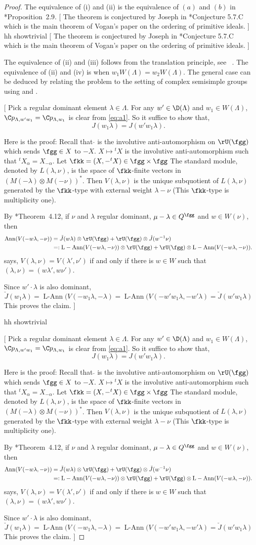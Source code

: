 \documentclass[12pt]{amsart}
\newcommand{\trivial}[2][]{\if\relax\detokenize{#1}\relax
  {%
      \color{orange} \vspace{0em}$[$#2$]$
      \color{black}
  }
  \else
\ifx#1h
\ifcsname showtrivial\endcsname
{%
    \color{orange}\vspace{0em}$[$#2$]$
    \color{black}
}
\fi
\else {\red Wrong argument!} \fi
\fi
}
\DeclareMathOperator{\Ann}{Ann}
\DeclareMathOperator{\LAnn}{L-Ann}
\numberwithin{equation}{section}
\theoremstyle{remark}
\begin{document}
\begin{proof}
The equivalence of (i) and (ii) is the equivalence of $(a)$ and $(b)$
in \cite{BV2}*{Proposition~2.9}.\trivial[h]{ The theorem is conjectured by Joseph in \cite{J79W}*{Conjecture 5.7.C}
which is the main theorem of Vogan's paper on the ordering of primitive ideals. }
The equivalence of (ii) and (iii) follows from the translation principle,
see~ \cite[Lemma~2.7]{V1}.
The equivalence of (ii) and (iv) is \cite[Theorem~5.1 and 5.5]{J2} when
$w_1 W(\Lambda) = w_2 W(\Lambda)$. The general case can be deduced by relating the problem to the setting of complex semisimple groups using  \cite[Theorem~4.12]{J79D} and \cite[Proposition~3.7]{Du77}.
\trivial[h]{
Pick a regular dominant element $\lambda\in \Lambda$.
For any $w'\in \D(\Lambda)$ and $w_1\in W(\Lambda)$,
$\C p_{\Lambda, w'w_1} = \C p_{\Lambda,w_1}$ is clear from \eqref{eq:a1}.
So it suffice to show that,
\[
J(w_1\lambda) = J(w'w_1\lambda).
\]

Here is the proof:
Recall that $\check{}$ is the involutive anti-automorphism on $\rU(\fgg)$ which sends $\fgg\in X$ to $-X$.
$X\mapsto {}^tX$ is the involutive anti-automorphism such that ${}^tX_\alpha = X_{-\alpha}$.
Let $\fkk = (X,-{}^tX) \in \fgg\times \fgg$
The standard module, denoted by $L(\lambda,\nu)$, is the space of $\fkk$-finite vectors in $(M(-\lambda)\otimes M(-\nu))^*$.
Then $V(\lambda,\nu)$ is the unique subquotient of $L(\lambda,\nu)$ generated by
the $\fkk$-type with external weight $\lambda-\nu$
(This $\fkk$-type is multiplicity one).

By \cite{J79D}*{Theorem~4.12}, if $\nu$ and $\lambda$ regular dominant,
$\mu-\lambda\in Q^\fgg$ and $w\in W(\nu)$, then
\[
\begin{split}
\Ann(V(-w\lambda,-\nu)) & =
\check{J}(w\lambda) \otimes \rU(\fgg) + \rU(\fgg) \otimes \check{J}(w^{-1} \nu)\\
& =: \LAnn(V(-w\lambda,-\nu))\otimes \rU(\fgg) + \rU(\fgg) \otimes\LAnn(V(-w\lambda,-\nu)).
\end{split}
\]
\cite[Proposition~3.7]{Du77} says, $V(\lambda,\nu) = V(\lambda',\nu')$ if and only if
there is $w\in W$ such that $(\lambda,\nu) = (w\lambda',w\nu')$.

Since $w'\cdot \lambda$ is also dominant,
\[
\check{J}(w_1\lambda) =
\LAnn(V(-w_1\lambda, -\lambda) =
\LAnn(V(-w' w_1\lambda, -w'\lambda)
= \check{J}(w'w_1\lambda)
\]
This proves the claim.
}



\end{proof}
\end{document}
